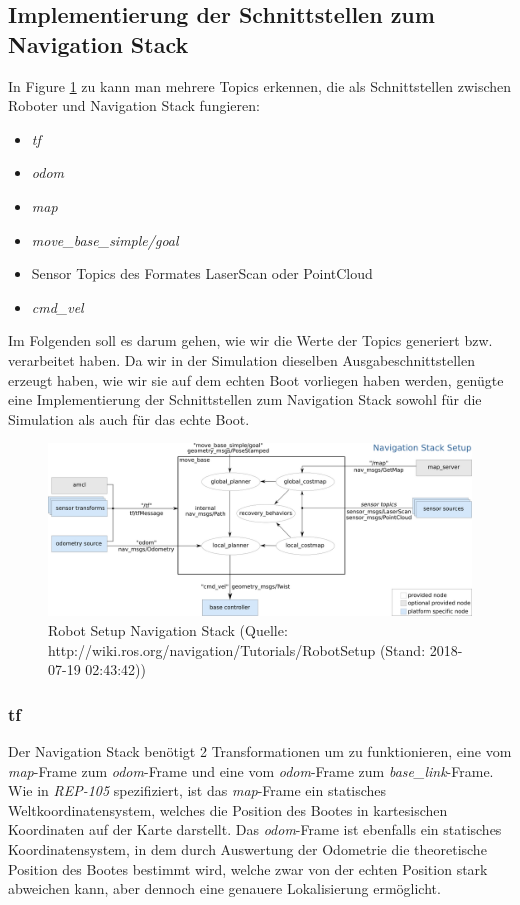 \documentclass[conference]{IEEEtran}
\begin{document}
\subsection{Implementierung der Schnittstellen zum Navigation Stack}

In Figure \ref{nav} zu kann man mehrere Topics erkennen, die als Schnittstellen zwischen Roboter und Navigation Stack fungieren:
\begin{itemize}
	\item \textit{tf}
	\item \textit{odom}
	\item \textit{map}
	\item \textit{move\_base\_simple/goal}
	\item Sensor Topics des Formates LaserScan oder PointCloud
	\item \textit{cmd\_vel}
\end{itemize}
Im Folgenden soll es darum gehen, wie wir die Werte der Topics generiert bzw. verarbeitet haben. Da wir in der Simulation dieselben Ausgabeschnittstellen erzeugt haben, wie wir sie auf dem echten Boot vorliegen haben werden, genügte eine Implementierung der Schnittstellen zum Navigation Stack sowohl für die Simulation als auch für das echte Boot.

\begin{figure}
	\includegraphics[width=\linewidth]{overview_tf.png}
	\caption{Robot Setup Navigation Stack (Quelle: http://wiki.ros.org/navigation/Tutorials/RobotSetup (Stand: 2018-07-19 02:43:42))}
	\label{nav}
\end{figure}

\subsubsection{tf}

Der Navigation Stack benötigt 2 Transformationen um zu funktionieren, eine vom \textit{map}-Frame zum \textit{odom}-Frame und eine vom \textit{odom}-Frame zum \textit{base\_link}-Frame. Wie in \textit{REP-105} \cite{REP105} spezifiziert, ist das \textit{map}-Frame ein statisches Weltkoordinatensystem, welches die Position des Bootes in kartesischen Koordinaten auf der Karte darstellt.  Das \textit{odom}-Frame ist ebenfalls ein statisches Koordinatensystem, in dem durch Auswertung der Odometrie die theoretische Position des Bootes bestimmt wird, welche zwar von der echten Position stark abweichen kann, aber dennoch eine genauere Lokalisierung ermöglicht.
\end{document}
